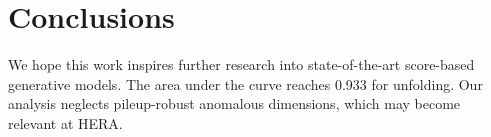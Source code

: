 \section{Conclusions}\label{sec:conclusions}

We hope this work inspires further research into state-of-the-art
score-based generative models. The area under the curve reaches 0.933
for unfolding. Our analysis neglects pileup-robust anomalous dimensions,
which may become relevant at HERA.

